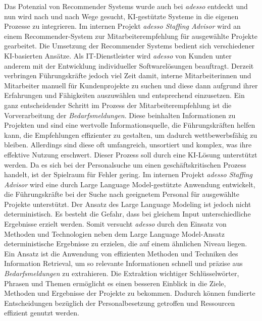 Das Potenzial von Recommender Systems wurde auch bei \emph{adesso} entdeckt und nun wird nach und nach Wege gesucht, KI-gestützte Systeme in die eigenen Prozesse zu integrieren. Im internen Projekt \emph{adesso Staffing Advisor} wird an einem Recommender-System zur Mitarbeiterempfehlung für ausgewählte Projekte gearbeitet. Die Umsetzung der Recommender Systems bedient sich verschiedener KI-basierten Ansätze. Als IT-Dienstleister wird \emph{adesso} von Kunden unter anderem mit der Entwicklung individueller Softwarelösungen beauftragt. Derzeit verbringen Führungskräfte jedoch viel Zeit damit, interne Mitarbeiterinnen und Mitarbeiter manuell für Kundenprojekte zu suchen und diese dann aufgrund ihrer Erfahrungen und Fähigkeiten auszuwählen und entsprechend einzusetzen. Ein ganz entscheidender Schritt im Prozess der Mitarbeiterempfehlung ist die Vorverarbeitung der \emph{Bedarfsmeldungen}. Diese beinhalten Informationen zu Projekten und sind eine wertvolle Informationsquelle, die Führungskräften helfen kann, die Empfehlungen effizienter zu gestalten, um dadurch wettbewerbsfähig zu bleiben. Allerdings sind diese oft umfangreich, unsortiert und komplex, was ihre effektive Nutzung erschwert. Dieser Prozess soll durch eine KI-Lösung unterstützt werden. Da es sich bei der Personalsuche um einen geschäftskritischen Prozess handelt, ist der Spielraum für Fehler gering. Im internen Projekt \emph{adesso Staffing Advisor} wird eine durch Large Language Model-gestützte Anwendung entwickelt, die Führungskräfte bei der Suche nach geeignetem Personal für ausgewählte Projekte unterstützt. Der Ansatz des Large Language Modeling ist jedoch nicht deterministisch. Es besteht die Gefahr, dass bei gleichem Input unterschiedliche Ergebnisse erzielt werden. Somit versucht \emph{adesso} durch den Einsatz von Methoden und Technologien neben dem Large Language Model-Ansatz deterministische Ergebnisse zu erzielen, die auf einem ähnlichen Niveau liegen. Ein Ansatz ist die Anwendung von effizienten Methoden und Techniken des Information Retrieval, um so relevante Informationen schnell und präzise aus \emph{Bedarfsmeldungen} zu extrahieren. Die Extraktion wichtiger Schlüsselwörter, Phrasen und Themen ermöglicht es einen besseren Einblick in die Ziele, Methoden und Ergebnisse der Projekte zu bekommen. Dadurch können fundierte Entscheidungen bezüglich der Personalbesetzung getroffen und Ressourcen effizient genutzt werden.\\
